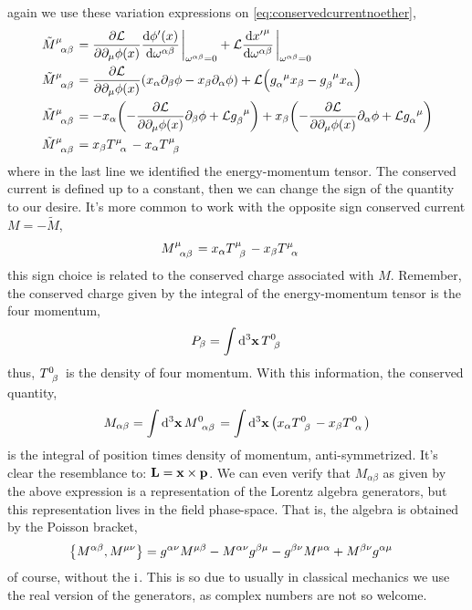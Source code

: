 again we use these variation expressions on \cref{eq:conservedcurrentnoether},
\begin{align}
    \tensor{{\tilde M}}{^\mu_\alpha_\beta} &=\pdv{\mathcal L}{\partial_\mu\phi\qty(x)}\dv{\phi'\qty(x)}{\omega^{\alpha\beta}}\eval_{\omega^{\alpha\beta}=0}+\mathcal L\dv{{x'}^\mu}{\omega^{\alpha\beta}}\eval_{\omega^{\alpha\beta}=0}\\
    \tensor{{\tilde M}}{^\mu_\alpha_\beta} &=\pdv{\mathcal L}{\partial_\mu\phi\qty(x)}\qty(x_\alpha\partial_\beta\phi-x_\beta\partial_\alpha\phi)+\mathcal L\qty(\tensor{g}{_\alpha^\mu}x_\beta-\tensor{g}{_\beta^\mu}x_\alpha)\\
    \tensor{{\tilde M}}{^\mu_\alpha_\beta} &=-x_\alpha\qty(-\pdv{\mathcal L}{\partial_\mu\phi\qty(x)}\partial_\beta\phi+\mathcal L\tensor{g}{_\beta^\mu})+x_\beta\qty(-\pdv{\mathcal L}{\partial_\mu\phi\qty(x)}\partial_\alpha\phi+\mathcal L\tensor{g}{_\alpha^\mu})\\
    \tensor{{\tilde M}}{^\mu_\alpha_\beta} &=x_\beta \tensor{T}{^\mu_\alpha}-x_\alpha \tensor{T}{^\mu_\beta}
\end{align}
where in the last line we identified the energy-momentum tensor. The conserved current is defined up to a constant, then we can change 
the sign of the quantity to our desire. It's more common to work with the opposite sign conserved current $M =-{\tilde M} $,
\begin{align}
    \tensor{M}{^\mu_\alpha_\beta} &=x_\alpha \tensor{T}{^\mu_\beta}-x_\beta \tensor{T}{^\mu_\alpha}
\end{align}
this sign choice is related to the conserved charge associated with $M$. Remember, the conserved charge given by the integral 
of the energy-momentum tensor is the four momentum,
\begin{align}
    P_\beta = \int\dd[3]{\vb x}\tensor{T}{^0_\beta}
\end{align}
thus, $\tensor{T}{^0_\beta}$ is the density of four momentum. With this information, the conserved quantity,
\begin{align}
    M_{\alpha\beta} = \int\dd[3]{\vb x}\tensor{M}{^0_\alpha_\beta}=\int\dd[3]{\vb x}\qty(x_\alpha \tensor{T}{^0_\beta}-x_\beta \tensor{T}{^0_\alpha})
\end{align}
is the integral of position times density of momentum, anti-symmetrized. It's clear the resemblance to: $\vb L = \vb x\times \vb p$. We can 
even verify that $M_{\alpha\beta}$ as given by the above expression is a representation of the Lorentz algebra generators, but this 
representation lives in the field phase-space. That is, the algebra is obtained by the Poisson bracket,
\begin{align}
    \acomm{M^{\alpha\beta}}{M^{\mu\nu}}&=\tensor{g}{^\alpha^\nu}M^{\mu\beta}-M^{\alpha\nu}g^{\beta\mu}-\tensor{g}{^\beta^\nu}M^{\mu\alpha}+M^{\beta\nu}g^{\alpha\mu}
\end{align}
of course, without the $\textnormal{i}$. This is so due to usually in classical mechanics we use the real version of the generators, as complex numbers are 
not so welcome.

